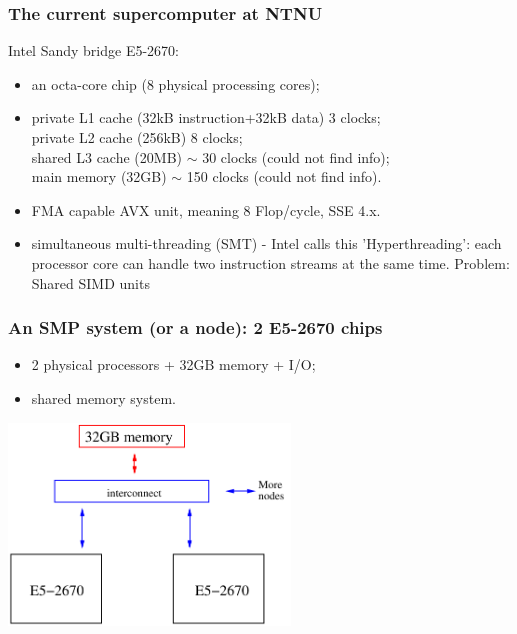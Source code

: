 \documentclass{beamer}
\begin{document}
\begin{frame}\frametitle{The current supercomputer at NTNU}
Intel Sandy bridge E5-2670:
\vspace{.2cm}
\begin{itemize}
\item an octa-core chip (8 physical processing cores); 
\vspace{.2cm}
\item private L1 cache (32kB instruction+32kB data) 3 clocks; \\
      private L2 cache (256kB) 8 clocks; \\
      shared L3 cache (20MB) $\sim$ 30 clocks (could not find info); \\
      main memory (32GB) $\sim$ 150 clocks (could not find info).
\item FMA capable AVX unit, meaning 8 Flop/cycle, SSE 4.x.
\vspace{.2cm}
\item simultaneous multi-threading (SMT) - Intel calls this 'Hyperthreading': 
each processor core can handle two instruction streams at the same time.
Problem: Shared SIMD units
\end{itemize}
\end{frame}


\begin{frame}\frametitle{An SMP system (or a node): 2 E5-2670 chips}
\begin{itemize}
\item 2 physical processors + 32GB memory + I/O;
\item shared memory system.
\end{itemize}
\vspace{.2cm}
\begin{center}
\includegraphics[width=7.5cm]{e5-2670}
\end{center}
\end{frame}
\end{document}
